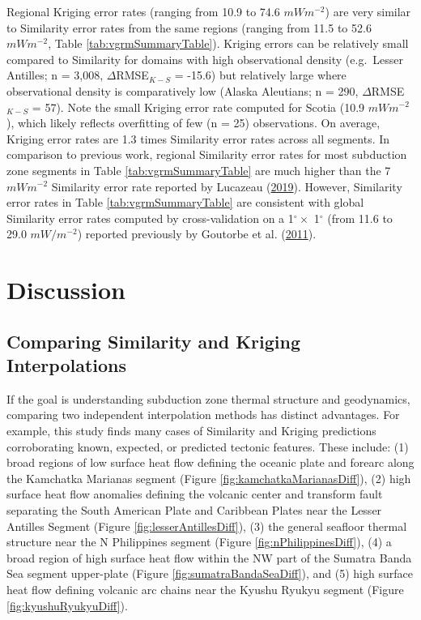 Regional Kriging error rates (ranging from 10.9 to 74.6 \(mWm^{-2}\)) are very similar to Similarity error rates from the same regions (ranging from 11.5 to 52.6 \(mWm^{-2}\), Table \ref{tab:vgrmSummaryTable}). Kriging errors can be relatively small compared to Similarity for domains with high observational density (e.g.~Lesser Antilles; n = 3,008, \(\Delta\)RMSE\(_{K-S}\) = -15.6) but relatively large where observational density is comparatively low (Alaska Aleutians; n = 290, \(\Delta\)RMSE\(_{K-S}\) = 57). Note the small Kriging error rate computed for Scotia (10.9 \(mWm^{-2}\)), which likely reflects overfitting of few (n = 25) observations. On average, Kriging error rates are 1.3 times Similarity error rates across all segments. In comparison to previous work, regional Similarity error rates for most subduction zone segments in Table \ref{tab:vgrmSummaryTable} are much higher than the 7 \(mWm^{-2}\) Similarity error rate reported by Lucazeau (\protect\hyperlink{ref-lucazeau2019}{2019}). However, Similarity error rates in Table \ref{tab:vgrmSummaryTable} are consistent with global Similarity error rates computed by cross-validation on a 1\(^\circ \times\) 1\(^\circ\) (from 11.6 to 29.0 \(mW/m^{-2}\)) reported previously by Goutorbe et al. (\protect\hyperlink{ref-goutorbe2011}{2011}).

\hypertarget{chpt3Discussion}{%
\section{Discussion}\label{chpt3Discussion}}

\hypertarget{interpDiffDiscussion}{%
\subsection{Comparing Similarity and Kriging Interpolations}\label{interpDiffDiscussion}}

If the goal is understanding subduction zone thermal structure and geodynamics, comparing two independent interpolation methods has distinct advantages. For example, this study finds many cases of Similarity and Kriging predictions corroborating known, expected, or predicted tectonic features. These include: (1) broad regions of low surface heat flow defining the oceanic plate and forearc along the Kamchatka Marianas segment (Figure \ref{fig:kamchatkaMarianasDiff}), (2) high surface heat flow anomalies defining the volcanic center and transform fault separating the South American Plate and Caribbean Plates near the Lesser Antilles Segment (Figure \ref{fig:lesserAntillesDiff}), (3) the general seafloor thermal structure near the N Philippines segment (Figure \ref{fig:nPhilippinesDiff}), (4) a broad region of high surface heat flow within the NW part of the Sumatra Banda Sea segment upper-plate (Figure \ref{fig:sumatraBandaSeaDiff}), and (5) high surface heat flow defining volcanic arc chains near the Kyushu Ryukyu segment (Figure \ref{fig:kyushuRyukyuDiff}).

